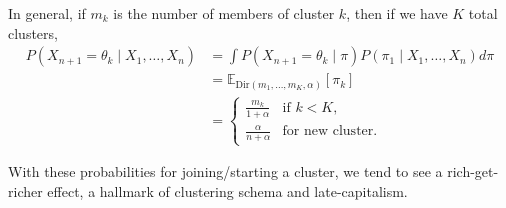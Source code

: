 \documentclass[twoside]{article}
\newcommand{\Dir}{\mathrm{Dir}}
\newcommand{\todo}[1]{{\color{red} TODO: #1}}
\begin{document}
In general, if $m_k$ is the number of members of cluster $k$, then if we have $K$ total clusters,
\begin{align*}
   P(X_{n+1} = \theta_k \mid X_1,\ldots,X_n)
&= \int P(X_{n+1} = \theta_k \mid \pi) P(\pi_1 \mid X_1,\ldots,X_n) d\pi  \\
&= \mathbb{E}_{\Dir(m_1,\ldots,m_K,\alpha)}[\pi_k] \\
&= \begin{cases}
    \frac{m_k}{1+\alpha} & \text{if } k<K,\\
    \frac{\alpha}{n+\alpha} & \text{for new cluster}.
\end{cases}
\end{align*}

With these probabilities for joining/starting a cluster, we tend to see a rich-get-richer effect, a hallmark of clustering schema and late-capitalism.




\end{document}
